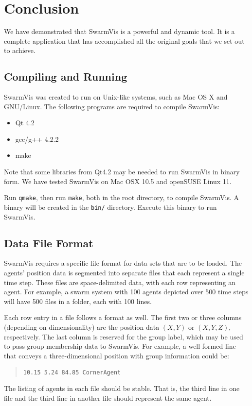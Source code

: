 \documentclass[conference]{IEEEtran}
\begin{document}
\section{Conclusion}
We have demonstrated that SwarmVis is a powerful and dynamic tool.
It is a complete application that has accomplished all the original goals that we set out to achieve.





\pagebreak


\subsection{Compiling and Running}
SwarmVis was created to run on Unix-like systems, such as Mac OS X and GNU/Linux.
The following programs are required to compile SwarmVis:
\begin{itemize}
\item Qt 4.2
\item gcc/g++ 4.2.2
\item make
\end{itemize}
Note that some libraries from Qt4.2 may be needed to run SwarmVis in binary form.
We have tested SwarmVis on Mac OSX 10.5 and openSUSE Linux 11.

Run \texttt{qmake}, then run \texttt{make}, both in the root directory, to compile SwarmVis.
A binary will be created in the \texttt{bin/} directory. Execute this binary to run SwarmVis.

\subsection{Data File Format}
SwarmVis requires a specific file format for data sets that are to be loaded. The agents' position data is segmented into
separate files that each represent a single time step. These files are space-delimited data, with
each row representing an agent. For example, a swarm system with 100 agents depicted over 500 time steps
will have 500 files in a folder, each with 100 lines.

Each row entry in a file follows a format as well. The first two or three  columns (depending on dimensionality) are the
position data $(X, Y)$ or $(X, Y, Z)$, respectively. The last column is reserved for the group label, which may be used to pass
group membership data to SwarmVis.
For example, a well-formed line that conveys a three-dimensional
position with group information could be:
\begin{quote}
\texttt{10.15 5.24 84.85 CornerAgent}
\end{quote}
The listing of agents in each file should be stable. That is, the third line in one file and the third line in another file
should represent the same agent.
\end{document}

